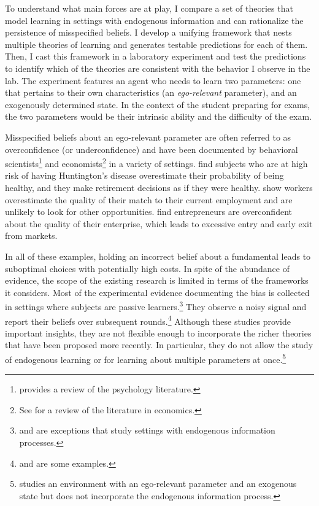 \documentclass[
  12pt,
]{article}
\begin{document}
To understand what main forces are at play, I compare a set of theories
that model learning in settings with endogenous information and can
rationalize the persistence of misspecified beliefs. I develop a
unifying framework that nests multiple theories of learning and
generates testable predictions for each of them. Then, I cast this
framework in a laboratory experiment and test the predictions to
identify which of the theories are consistent with the behavior I
observe in the lab. The experiment features an agent who needs to learn
two parameters: one that pertains to their own characteristics (an
\emph{ego-relevant} parameter), and an exogenously determined state. In
the context of the student preparing for exams, the two parameters would
be their intrinsic ability and the difficulty of the exam.

Misspecified beliefs about an ego-relevant parameter are often referred
to as overconfidence (or underconfidence) and have been documented by
behavioral
scientists\footnote{\citet{kelley1980} provides a review of the psychology literature.}
and
economists\footnote{See \citet{benjamin2019} for a review of the literature in economics.}
in a variety of settings. \citet{Oster2013} find subjects who are at
high risk of having Huntington's disease overestimate their probability
of being healthy, and they make retirement decisions as if they were
healthy. \citet{Hoffman2020} show workers overestimate the quality of
their match to their current employment and are unlikely to look for
other opportunities. \citet{Camerer1999} find entrepreneurs are
overconfident about the quality of their enterprise, which leads to
excessive entry and early exit from markets.

In all of these examples, holding an incorrect belief about a
fundamental leads to suboptimal choices with potentially high costs. In
spite of the abundance of evidence, the scope of the existing research
is limited in terms of the frameworks it considers. Most of the
experimental evidence documenting the bias is collected in settings
where subjects are passive
learners.\footnote{\citet{Gotte2022} and \citet{Ozyilmaz2022} are exceptions that study settings with endogenous information processes.}
They observe a noisy signal and report their beliefs over subsequent
rounds.\footnote{\citet{Bracha2012} and \citet{Mobius2022} are some examples.}
Although these studies provide important insights, they are not flexible
enough to incorporate the richer theories that have been proposed more
recently. In particular, they do not allow the study of endogenous
learning or for learning about multiple parameters at
once.\footnote{\citet{Coutts2020} studies an environment with an ego-relevant parameter and an exogenous state but does not 
incorporate the endogenous information process.}
\end{document}
